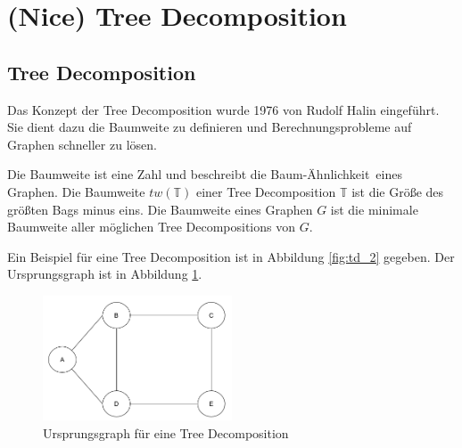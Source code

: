 \section{(Nice) Tree Decomposition}
\label{c:ntd}

\subsection{Tree Decomposition}
\label{sec:ntd_td}

Das Konzept der Tree Decomposition wurde 1976 von Rudolf Halin \cite{Halin1976} eingeführt. Sie dient dazu die Baumweite zu definieren und Berechnungsprobleme auf Graphen schneller zu lösen.

Die Baumweite ist eine Zahl und beschreibt die \glqq Baum-Ähnlichkeit\grqq ~eines Graphen. Die Baumweite $tw(\mathbb{T})$ einer Tree Decomposition $\mathbb{T}$ ist die Größe des größten Bags minus eins. Die Baumweite eines Graphen $G$ ist die minimale Baumweite aller möglichen Tree Decompositions von $G$.

Ein Beispiel für eine Tree Decomposition ist in Abbildung \ref{fig:td_2} gegeben. Der Ursprungsgraph ist in Abbildung \ref{fig:td_1}.

\begin{figure}
\centering
\includegraphics[width=0.5\textwidth]{./imgs/TD_1.png}
\caption{Ursprungsgraph für eine Tree Decomposition}
\label{fig:td_1}
\end{figure}

